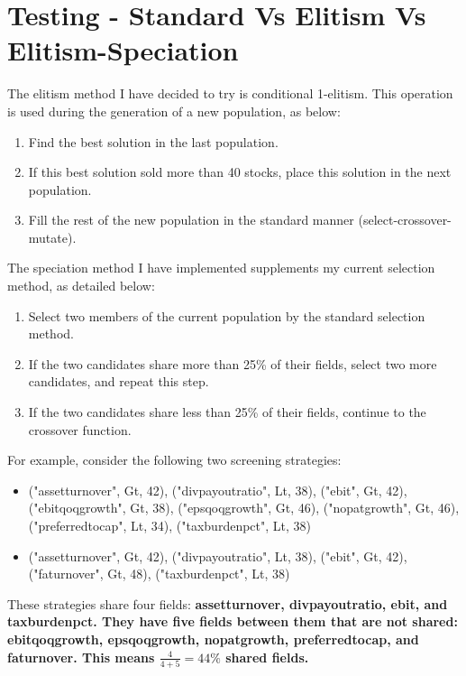 \section{Testing - Standard Vs Elitism Vs Elitism-Speciation}
The elitism method I have decided to try is conditional 1-elitism. This operation is used during the generation of a new population, as below:

\begin{enumerate}
    \item Find the best solution in the last population.
    \item If this best solution sold more than 40 stocks, place this solution in the next population.
    \item Fill the rest of the new population in the standard manner (select-crossover-mutate).
\end{enumerate}

\noindent The speciation method I have implemented supplements my current selection method, as detailed below:
\begin{enumerate}
    \item Select two members of the current population by the standard selection method.
    \item If the two candidates share more than 25\% of their fields, select two more candidates, and repeat this step.
    \item If the two candidates share less than 25\% of their fields, continue to the crossover function.
\end{enumerate}

\noindent For example, consider the following two screening strategies:
\begin{itemize}
    \item ("assetturnover", Gt, 42), ("divpayoutratio", Lt, 38), ("ebit", Gt, 42), ("ebitqoqgrowth", Gt, 38), ("epsqoqgrowth", Gt, 46), ("nopatgrowth", Gt, 46), ("preferredtocap", Lt, 34), ("taxburdenpct", Lt, 38)
    \item ("assetturnover", Gt, 42), ("divpayoutratio", Lt, 38), ("ebit", Gt, 42), ("faturnover", Gt, 48), ("taxburdenpct", Lt, 38)
\end{itemize}

\noindent These strategies share four fields: \bf assetturnover\rm, \bf divpayoutratio\rm, \bf ebit\rm, and \bf taxburdenpct\rm. They have five fields between them that are not shared: \bf ebitqoqgrowth\rm, \bf epsqoqgrowth\rm, \bf nopatgrowth\rm, \bf preferredtocap\rm, and \bf faturnover\rm. This means $\frac{4}{4 + 5} = 44\% $ shared fields. \newline

